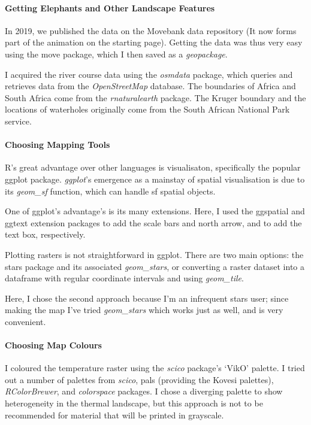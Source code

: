 	\medskip

	\paragraph*{Getting Elephants and Other Landscape Features}

	In 2019, we published the data on the Movebank data repository (It now forms part of the animation on the starting page). Getting the data was thus very easy using the move package, which I then saved as a \textit{geopackage}.

	I acquired the river course data using the \textit{osmdata} package, which queries and retrieves data from the \textit{OpenStreetMap} database. The boundaries of Africa and South Africa come from the \textit{rnaturalearth} package. The Kruger boundary and the locations of waterholes originally come from the South African National Park service.

	\medskip

	\paragraph*{Choosing Mapping Tools}

	R's great advantage over other languages is visualisaton, specifically the popular ggplot package. \textit{ggplot}'s emergence as a mainstay of spatial visualisation is due to its \textit{geom\_sf} function, which can handle sf spatial objects.
	
	One of ggplot's advantage's is its many extensions. Here, I used the ggspatial and ggtext extension packages to add the scale bars and north arrow, and to add the text box, respectively.
	
	Plotting rasters is not straightforward in ggplot. There are two main options: the stars package and its associated \textit{geom\_stars}, or converting a raster dataset into a dataframe with regular coordinate intervals and using \textit{geom\_tile}.
	
	Here, I chose the second approach because I'm an infrequent stars user; since making the map I've tried \textit{geom\_stars} which works just as well, and is very convenient.

	\medskip

	\paragraph*{Choosing Map Colours}

	I coloured the temperature raster using the \textit{scico} package's `VikO' palette. I tried out a number of palettes from \textit{scico}, pals (providing the Kovesi palettes), \textit{RColorBrewer}, and \textit{colorspace} packages. I chose a diverging palette to show heterogeneity in the thermal landscape, but this approach is not to be recommended for material that will be printed in grayscale.

